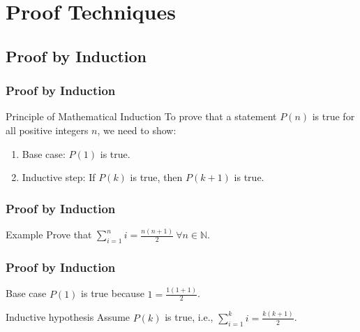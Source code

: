 \documentclass[t]{beamer}
\begin{document}
    \section{Proof Techniques}
        \subsection{Proof by Induction}
            \begin{frame}
                \frametitle{Proof by Induction}
                \begin{block}{Principle of Mathematical Induction}
                    To prove that a statement $P(n)$ is true for all positive integers $n$, we need to show:
                    \begin{enumerate}
                        \item<1-> Base case: $P(1)$ is true.
                        \item<2-> Inductive step: If $P(k)$ is true, then $P(k+1)$ is true.
                    \end{enumerate}
                \end{block}
            \end{frame}

            \begin{frame}
                \frametitle{Proof by Induction}
                \begin{block}{Example}
                    Prove that $\sum_{i = 1}^{n} i = \frac{n(n+1)}{2}\ \forall n \in \mathbb{N}$.
                \end{block}
            \end{frame}

            \begin{frame}
                \frametitle{Proof by Induction}
                \begin{block}{Base case}
                    $P(1)$ is true because $1 = \frac{1(1+1)}{2}$.
                \end{block}

                \begin{block}{Inductive hypothesis}
                    Assume $P(k)$ is true, i.e., $\sum_{i = 1}^{k} i = \frac{k(k+1)}{2}$.
                \end{block}
            \end{frame}
\end{document}
